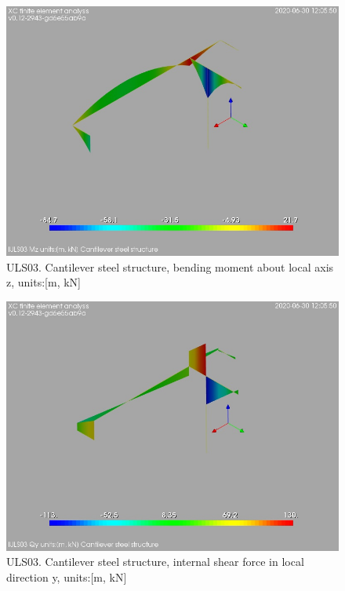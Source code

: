 \begin{figure}
\begin{center}
\includegraphics[width=\linewidth]{ramp_wall/resLC/text/graphics/resSimplLC/lULS03steelMembersMz}
\caption{ULS03. Cantilever steel structure, bending moment about local axis z, units:[m, kN]}
\end{center}
\end{figure}
\begin{figure}
\begin{center}
\includegraphics[width=\linewidth]{ramp_wall/resLC/text/graphics/resSimplLC/lULS03steelMembersQy}
\caption{ULS03. Cantilever steel structure, internal shear force in local direction y, units:[m, kN]}
\end{center}
\end{figure}
